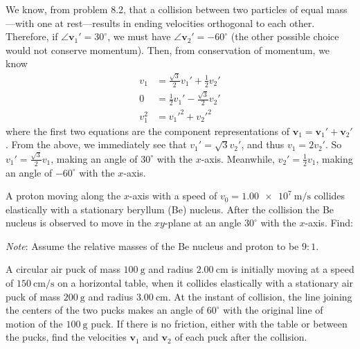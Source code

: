 \documentclass[../feynman-lectures-on-physics.tex]{subfiles}
\begin{document}
\begin{questions}
  \begin{solution}
    We know, from problem 8.2, that a collision between two particles of equal
    mass---with one at rest---results in ending velocities orthogonal to each
    other. Therefore, if $\angle\mathbf{v}_1'=30^\circ$, we must have
    $\angle\mathbf{v}_2' = -60^\circ$ (the other possible choice would not
    conserve momentum). Then, from conservation of momentum, we know
    \begin{align*}
      v_1 &= \frac{\sqrt{3}}{2}v_1' + \frac{1}{2}v_2' \\
      0 &= \frac{1}{2}v_1' - \frac{\sqrt{3}}{2}v_2' \\
      v_1^2 &= v_1'^2 + v_2'^2
    \end{align*}
    where the first two equations are the component representations of
    $\mathbf{v}_1 = \mathbf{v}_1' + \mathbf{v}_2'$. From the above, we
    immediately see that $v_1'=\sqrt{3}v_2'$, and thus $v_1 = 2v_2'$. So $v_1' =
    \frac{\sqrt{3}}{2}v_1$, making an angle of $30^\circ$ with the $x$-axis.
    Meanwhile, $v_2' = \frac{1}{2}v_1$, making an angle of $-60^\circ$ with the $x$-axis.
  \end{solution}

\question A proton moving along the $x$-axis with a speed of
  $v_0=\SI{1.00e7}{\meter\per\second}$ collides elastically with a
  stationary beryllum (Be) nucleus. After the collision the Be nucleus
  is observed to move in the $xy$-plane at an angle $30^\circ$ with the
  $x$-axis. Find:
  \textit{Note}: Assume the relative masses of the Be nucleus and
  proton to be $9 : 1$.

\question A circular air puck of mass $\SI{100}{\gram}$ and radius
  $\SI{2.00}{\centi\meter}$ is initially moving at a speed of
  $\SI{150}{\centi\meter\per\second}$ on a horizontal table, when it collides
  elastically with a stationary air puck of mass $\SI{200}{\gram}$ and radius
  $\SI{3.00}{\centi\meter}$. At the instant of collision, the line joining the
  centers of the two pucks makes an angle of $60^\circ$ with the original line
  of motion of the $\SI{100}{\gram}$ puck. If there is no friction, either
  with the table or between the pucks, find the velocities $\mathbf{v}_1$ and
  $\mathbf{v}_2$ of each puck after the collision.


\end{questions}
\end{document}
